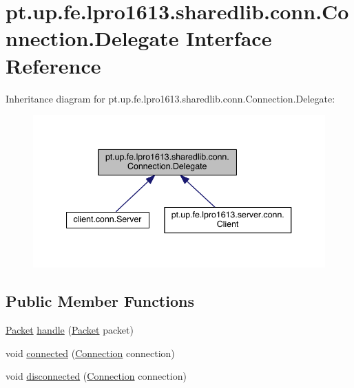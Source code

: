 \hypertarget{interfacept_1_1up_1_1fe_1_1lpro1613_1_1sharedlib_1_1conn_1_1_connection_1_1_delegate}{}\section{pt.\+up.\+fe.\+lpro1613.\+sharedlib.\+conn.\+Connection.\+Delegate Interface Reference}
\label{interfacept_1_1up_1_1fe_1_1lpro1613_1_1sharedlib_1_1conn_1_1_connection_1_1_delegate}


Inheritance diagram for pt.\+up.\+fe.\+lpro1613.\+sharedlib.\+conn.\+Connection.\+Delegate\+:
\nopagebreak
\begin{figure}[H]
\begin{center}
\leavevmode
\includegraphics[width=343pt]{interfacept_1_1up_1_1fe_1_1lpro1613_1_1sharedlib_1_1conn_1_1_connection_1_1_delegate__inherit__graph}
\end{center}
\end{figure}
\subsection*{Public Member Functions}
\begin{DoxyCompactItemize}
\item 
\hyperlink{classpt_1_1up_1_1fe_1_1lpro1613_1_1sharedlib_1_1conn_1_1_packet}{Packet} \hyperlink{interfacept_1_1up_1_1fe_1_1lpro1613_1_1sharedlib_1_1conn_1_1_connection_1_1_delegate_a5b0f77e34d93967ae53cf7e01f0e2835}{handle} (\hyperlink{classpt_1_1up_1_1fe_1_1lpro1613_1_1sharedlib_1_1conn_1_1_packet}{Packet} packet)
\item 
void \hyperlink{interfacept_1_1up_1_1fe_1_1lpro1613_1_1sharedlib_1_1conn_1_1_connection_1_1_delegate_afeb3c54ced46916733df2ba0b0e2d87e}{connected} (\hyperlink{classpt_1_1up_1_1fe_1_1lpro1613_1_1sharedlib_1_1conn_1_1_connection}{Connection} connection)
\item 
void \hyperlink{interfacept_1_1up_1_1fe_1_1lpro1613_1_1sharedlib_1_1conn_1_1_connection_1_1_delegate_a39547a28a5b1818ca952e8d3d8da15ba}{disconnected} (\hyperlink{classpt_1_1up_1_1fe_1_1lpro1613_1_1sharedlib_1_1conn_1_1_connection}{Connection} connection)
\end{DoxyCompactItemize}


